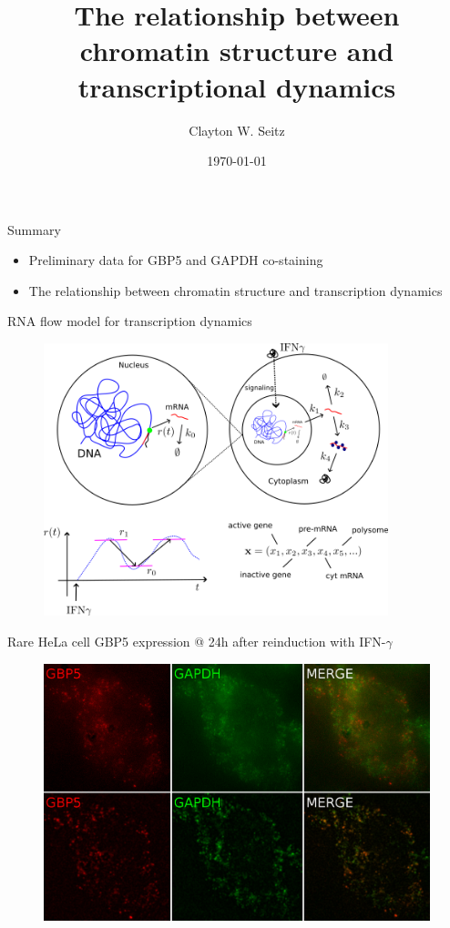\documentclass[aspectratio=1610]{beamer}					%
\title{The relationship between chromatin structure and transcriptional dynamics}	%
\author{Clayton W. Seitz}								%
\date{\today}									%
\begin{document}
\begin{frame}
  \titlepage
\end{frame}


%


\begin{frame}{Summary}
\begin{itemize}
\item Preliminary data for GBP5 and GAPDH co-staining
\item The relationship between chromatin structure and transcription dynamics
\end{itemize}
\end{frame}

\begin{frame}{RNA flow model for transcription dynamics}
\begin{figure}
\includegraphics[width=10cm]{RNAFlow.png}
\end{figure}
\end{frame}

\begin{frame}{Rare HeLa cell GBP5 expression @ 24h after reinduction with IFN-$\gamma$}
\begin{figure}
\includegraphics[width=12cm]{Stains.png}
\end{figure}
\end{frame}
\end{document}

